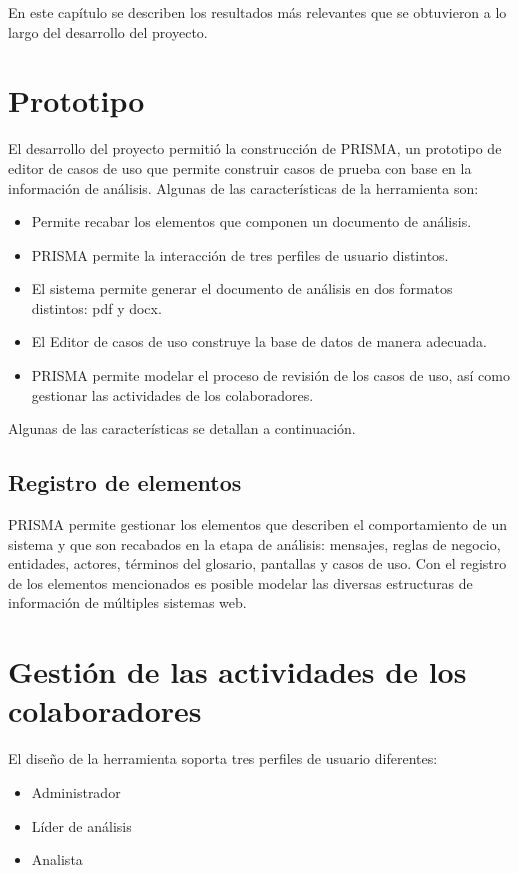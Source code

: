 En este capítulo se describen los resultados más relevantes que se obtuvieron a lo largo del desarrollo del proyecto. 

\section{Prototipo}
El desarrollo del proyecto permitió la construcción de PRISMA, un prototipo de editor de casos de uso que permite construir casos de prueba con base en la información de análisis. Algunas de las
características de la herramienta son:

\begin{itemize}
 \item Permite recabar los elementos que componen un documento de análisis.
 \item PRISMA permite la interacción de tres perfiles de usuario distintos.
 \item El sistema permite generar el documento de análisis en dos formatos distintos: pdf y docx.
 \item El Editor de casos de uso construye la base de datos de manera adecuada.
 \item PRISMA permite modelar el proceso de revisión de los casos de uso, así como gestionar las actividades de los colaboradores.
\end{itemize}

Algunas de las características se detallan a continuación.

\subsection*{Registro de elementos}
PRISMA permite gestionar los elementos que describen el comportamiento de un sistema y que son recabados en la etapa de análisis: mensajes, reglas de negocio, entidades, actores, términos del glosario, pantallas y casos de uso. Con el registro 
de los elementos mencionados es posible modelar las diversas estructuras de información de múltiples sistemas web. 

\section*{Gestión de las actividades de los colaboradores}
El diseño de la herramienta soporta tres perfiles de usuario diferentes:
\begin{itemize}
 \item Administrador 
 \item Líder de análisis
 \item Analista
\end{itemize}

